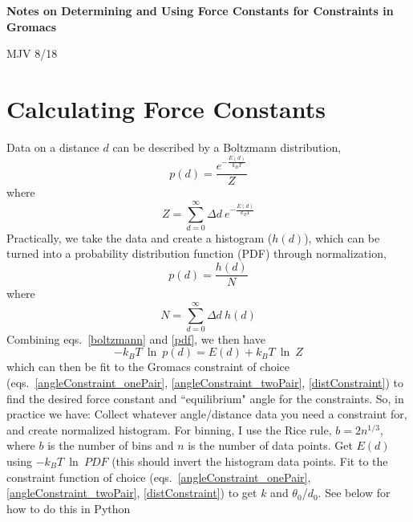 \documentclass[11pt]{article}
\newcommand{\ee}[1]{e^{#1}}
\begin{document}
\singlespacing
{\Large\textbf{Notes on Determining and Using Force Constants for Constraints in Gromacs}}

MJV 8/18

\section{Calculating Force Constants}
    \begin{outline}
        \1 Data on a distance $d$ can be described by a Boltzmann distribution,
            \begin{equation}
                \label{boltzmann}
                p(d) = \frac{\ee{-\frac{E(d)}{k_B T}}}{Z}
            \end{equation}
            where
            \begin{equation*}
                Z = \sum\limits^{\infty}_{d=0} \Delta d~\ee{-\frac{E(d)}{k_B T}}
            \end{equation*}
        \1 Practically, we take the data and create a histogram ($h(d)$), which can be turned into a probability distribution function (PDF) through normalization,
            \begin{equation}
                \label{pdf}
                p(d) = \frac{h(d)}{N}
            \end{equation}
            where
            \begin{equation}
                N = \sum\limits^{\infty}_{d=0} \Delta d~h(d)
            \end{equation}
        \1 Combining eqs.~\ref{boltzmann} and \ref{pdf}, we then have
            \begin{equation}
                \label{invert}
                -k_BT~\ln~p(d) = E(d) + k_B T~\ln~Z
            \end{equation}
            which can then be fit to the Gromacs constraint of choice (eqs.~\ref{angleConstraint_onePair}, \ref{angleConstraint_twoPair}, \ref{distConstraint}) to find the desired force constant and ``equilibrium" angle for the constraints.
        \1 So, in practice we have:
            \2 Collect whatever angle/distance data you need a constraint for, and create normalized histogram.
                \3 For binning, I use the Rice rule, $b = 2n^{1/3}$, where $b$ is the number of bins and $n$ is the number of data points.
            \2 Get $E(d)$ using $-k_BT~\ln~PDF$ (this should invert the histogram data points.
            \2 Fit to the constraint function of choice (eqs.~\ref{angleConstraint_onePair}, \ref{angleConstraint_twoPair}, \ref{distConstraint}) to get $k$ and $\theta_0$/$d_0$.
                \3 See below for how to do this in Python
    \end{outline}
\end{document}
